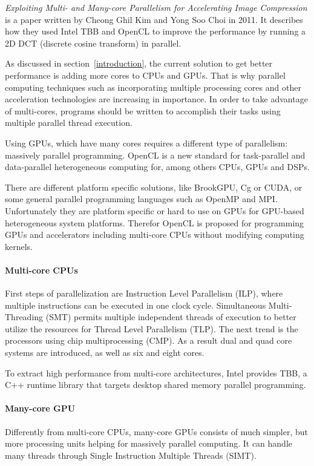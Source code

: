 \emph{Exploiting Multi- and Many-core Parallelism for Accelerating Image
Compression} \cite{KimExploitingMultiManyCore} is a paper written by Cheong
Ghil Kim and Yong Soo Choi in 2011. It describes how they used Intel TBB and
OpenCL to improve the performance by running a 2D DCT (discrete cosine
transform) in parallel.

As discussed in section~\ref{introduction}, the current solution to get better
performance is adding more cores to CPUs and GPUs. That is why parallel
computing techniques such as incorporating multiple processing cores and other
acceleration technologies are increasing in importance. In order to take
advantage of multi-cores, programs should be written to accomplish their tasks
using multiple parallel thread execution.

Using GPUs, which have many cores requires a different type of parallelism:
massively parallel programming. OpenCL is a new standard for task-parallel and
data-parallel heterogeneous computing for, among others CPUs, GPUs and DSPs.

There are different platform specific solutions, like BrookGPU, Cg or CUDA, or
some general parallel programming languages such as OpenMP and MPI\@.
Unfortunately they are platform specific or hard to use on GPUs for GPU-based
heterogeneous system platforms. Therefor OpenCL is proposed for programming
GPUs and accelerators including multi-core CPUs without modifying computing
kernels.

\paragraph{Multi-core CPUs}

First steps of parallelization are Instruction Level Parallelism (ILP), where
multiple instructions can be executed in one clock cycle. Simultaneous
Multi-Threading (SMT) permits multiple independent threads of execution to
better utilize the resources for Thread Level Parallelism (TLP). The next trend
is the processors using chip multiprocessing (CMP). As a result dual and quad
core systems are introduced, as well as six and eight cores.

To extract high performance from multi-core architectures, Intel provides TBB,
a C++ runtime library that targets desktop shared memory parallel programming.

\paragraph{Many-core GPU} Differently from multi-core CPUs, many-core GPUs
consists of much simpler, but more processing units helping for massively
parallel computing. It can handle many threads through Single Instruction
Multiple Threads (SIMT).

